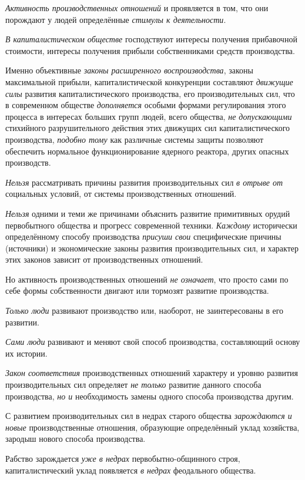 \documentclass[a4paper,14pt,russian]{extreport}
\begin{document}
\emph{Активность производственных отношений} и проявляется в том, что они порождают у людей определённые \emph{стимулы к деятельности}.

\emph{В капиталистическом обществе} господствуют интересы получения прибавочной стоимости, интересы получения прибыли собственниками средств производства.

Именно объективные \emph{законы расширенного воспроизводства}, законы максимальной прибыли, капиталистической конкуренции составляют \emph{движущие силы} развития капиталистического производства, его производительных сил, что в современном обществе \emph{дополняется} особыми формами регулирования этого процесса в интересах больших групп людей, всего общества, \emph{не допускающими} стихийного разрушительного действия этих движущих сил капиталистического производства, \emph{подобно тому} как различные системы защиты позволяют обеспечить нормальное функционирование ядерного реактора, других опасных производств.

\emph{Нельзя} рассматривать причины развития производительных сил \emph{в отрыве от} социальных условий, от системы производственных отношений.

\emph{Нельзя} одними и теми же причинами объяснить развитие примитивных орудий первобытного общества и прогресс современной техники. \emph{Каждому} исторически определённому способу производства \emph{присуши свои} специфические причины (источники) и экономические законы развития производительных сил, и характер этих законов зависит от производственных отношений.

Но активность производственных отношений \emph{не означает}, что просто сами по себе формы собственности двигают или тормозят развитие производства.

\emph{Только люди} развивают производство или, наоборот, не заинтересованы в его развитии.

\emph{Сами люди} развивают и меняют свой способ производства, составляющий основу их истории.

\emph{Закон соответствия} производственных отношений характеру и уровню развития производительных сил определяет \emph{не только} развитие данного способа производства, \emph{но и} необходимость замены одного способа производства другим.

С развитием производительных сил в недрах старого общества \emph{зарождаются и новые} производственные отношения, образующие определённый уклад хозяйства, зародыш нового способа производства.

Рабство зарождается \emph{уже в недрах} первобытно-общинного строя, капиталистический уклад появляется \emph{в недрах} феодального общества.
\end{document}
